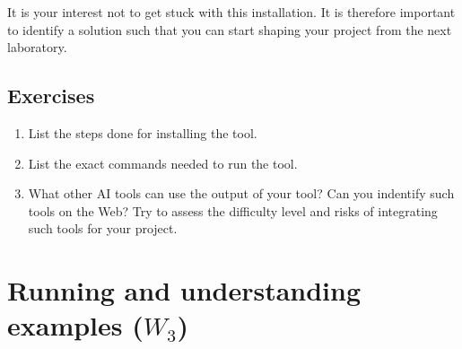 \documentclass[a4paper,12pt]{report}
\begin{document}
It is your interest not to get stuck with this installation. 
It is therefore important to identify a solution such that you 
can start shaping your project from the next laboratory. 


\section{Exercises}
\begin{enumerate}
 \item List the steps done for installing the tool. 
 \item List the exact commands needed to run the tool. 
 \item What other AI tools can use the output of your tool? 
 Can you indentify such tools on the Web?
 Try to assess the difficulty level and risks of integrating such tools for your project.
\end{enumerate}

\vspace{0.5cm}

\vspace{0.5cm}

\vspace{0.5cm}




\chapter{Running and understanding examples ($W_3$)}

\colorbox{blue!20}{}
\end{document}
